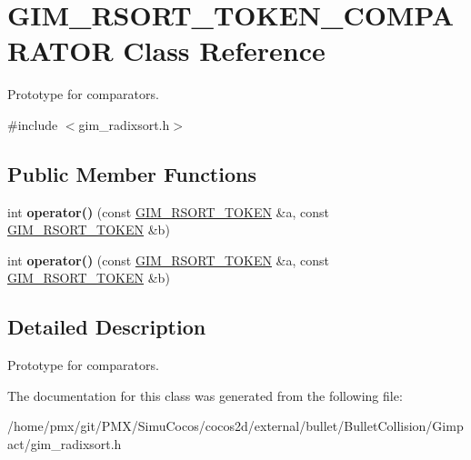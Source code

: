 \hypertarget{classGIM__RSORT__TOKEN__COMPARATOR}{}\section{G\+I\+M\+\_\+\+R\+S\+O\+R\+T\+\_\+\+T\+O\+K\+E\+N\+\_\+\+C\+O\+M\+P\+A\+R\+A\+T\+OR Class Reference}
\label{classGIM__RSORT__TOKEN__COMPARATOR}


Prototype for comparators.  




{\ttfamily \#include $<$gim\+\_\+radixsort.\+h$>$}

\subsection*{Public Member Functions}
\begin{DoxyCompactItemize}
\item 
\mbox{\label{classGIM__RSORT__TOKEN__COMPARATOR_acceb7639bbe849343b9bfd355def8168}} 
int {\bfseries operator()} (const \hyperlink{structGIM__RSORT__TOKEN}{G\+I\+M\+\_\+\+R\+S\+O\+R\+T\+\_\+\+T\+O\+K\+EN} \&a, const \hyperlink{structGIM__RSORT__TOKEN}{G\+I\+M\+\_\+\+R\+S\+O\+R\+T\+\_\+\+T\+O\+K\+EN} \&b)
\item 
\mbox{\label{classGIM__RSORT__TOKEN__COMPARATOR_acceb7639bbe849343b9bfd355def8168}} 
int {\bfseries operator()} (const \hyperlink{structGIM__RSORT__TOKEN}{G\+I\+M\+\_\+\+R\+S\+O\+R\+T\+\_\+\+T\+O\+K\+EN} \&a, const \hyperlink{structGIM__RSORT__TOKEN}{G\+I\+M\+\_\+\+R\+S\+O\+R\+T\+\_\+\+T\+O\+K\+EN} \&b)
\end{DoxyCompactItemize}


\subsection{Detailed Description}
Prototype for comparators. 

The documentation for this class was generated from the following file\+:\begin{DoxyCompactItemize}
\item 
/home/pmx/git/\+P\+M\+X/\+Simu\+Cocos/cocos2d/external/bullet/\+Bullet\+Collision/\+Gimpact/gim\+\_\+radixsort.\+h\end{DoxyCompactItemize}
